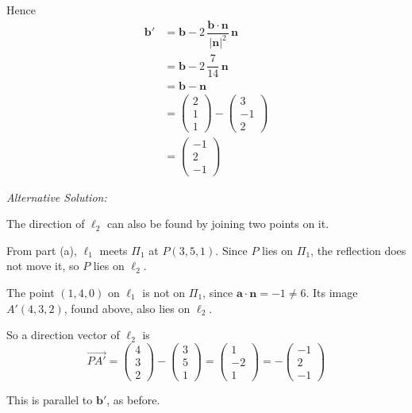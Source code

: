 \documentclass[leqno]{article}
\begin{document}
\begin{enumerate}[
  label=\textbf{\arabic*.},
  leftmargin=*,
  topsep=0pt,
  partopsep=0pt,
  parsep=0pt
]
\begin{djsSolution}
\begin{enumerate}[label=\textbf{(\alph*)}]
Hence
\begin{align*}
\mathbf b'
&=
\mathbf b
-2\,\dfrac{\mathbf b\cdot\mathbf n}{|\mathbf n|^2}\,\mathbf n\\
&=
\mathbf b
-2\,\dfrac{7}{14}\,\mathbf n\\
&=
\mathbf b-\mathbf n\\
&=
\begin{pmatrix}2\\1\\1\end{pmatrix}
-
\begin{pmatrix}3\\-1\\2\end{pmatrix}\\
&=
\begin{pmatrix}-1\\2\\-1\end{pmatrix}
\end{align*}

{\setlength{\parskip}{8pt}%
\textit{Alternative Solution:}

The direction of $\ell_2$ can also be found by joining two points on it.

From part (a), $\ell_1$ meets $\Pi_1$ at $P(3,5,1)$. Since $P$ lies on $\Pi_1$, the reflection does not move it, so $P$ lies on $\ell_2$.

The point $(1,4,0)$ on $\ell_1$ is not on $\Pi_1$, since $\mathbf a\cdot\mathbf n=-1\neq 6$. Its image $A'(4,3,2)$, found above, also lies on $\ell_2$.

So a direction vector of $\ell_2$ is
\[
\overrightarrow{PA'}
=
\begin{pmatrix}4\\3\\2\end{pmatrix}
-
\begin{pmatrix}3\\5\\1\end{pmatrix}
=
\begin{pmatrix}1\\-2\\1\end{pmatrix}
=
-\begin{pmatrix}-1\\2\\-1\end{pmatrix}
\]

This is parallel to $\mathbf b'$, as before.
\par}


\end{enumerate}
\end{djsSolution}
\end{enumerate}
\end{document}
